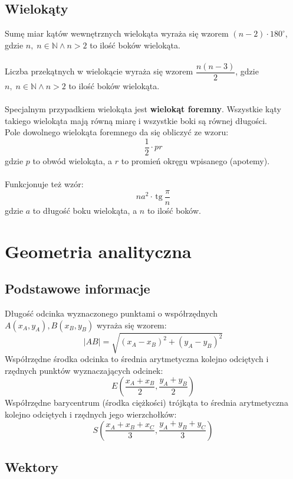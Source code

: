 \documentclass[14pt,a4paper]{extarticle}
\newcommand{\Verts}[1]{\left\lVert#1\right\rVert}
\newcommand{\tg}{\,\text{tg}\:}
\begin{document}
\subsection{Wielokąty}
\noindent Sumę miar kątów wewnętrznych wielokąta wyraża się wzorem $(n - 2)\cdot 180^{\circ}$, gdzie $n,\; n\in \mathbb{N} \land n > 2$
to ilość boków wielokąta.\\\\
\noindent Liczba przekątnych w wielokącie wyraża się wzorem $\dfrac{n(n-3)}{2}$, gdzie $n,\; n\in \mathbb{N} \land n > 2$
to ilość boków wielokąta.\\\\
Specjalnym przypadkiem wielokąta jest \textbf{wielokąt foremny}. Wszystkie kąty takiego wielokąta mają
równą miarę i wszystkie boki są równej długości.\\
Pole dowolnego wielokąta foremnego da się obliczyć ze wzoru:
$$\dfrac{1}{2}\cdot pr$$
gdzie $p$ to obwód wielokąta, a $r$ to promień okręgu wpisanego (apotemy).\\\\ Funkcjonuje też wzór:
$$na^{2}\cdot\tg\frac{\pi}{n}$$
gdzie $a$ to długość boku wielokąta, a $n$ to ilość boków.

\newpage
\section{Geometria analityczna}

\subsection{Podstawowe informacje}
\MoveBelowBox
{}
\hfill\break
\noindent Długość odcinka wyznaczonego punktami o współrzędnych $A(x_{A}, y_{A}), B(x_{B}, y_{B})$
wyraża się wzorem:
$$\vert AB\vert = \sqrt{(x_{A} - x_{B})^{2}+(y_{A}-y_{B})^{2}}$$
\MoveBelowBox
\noindent Współrzędne środka odcinka to średnia arytmetyczna kolejno odciętych i rzędnych punktów wyznaczających odcinek:
$$E\left(\dfrac{x_{A}+x_{B}}{2}, \dfrac{y_{A}+y_{B}}{2}\right)$$
\noindent Współrzędne barycentrum (środka ciężkości) trójkąta to średnia arytmetyczna kolejno odciętych i
rzędnych jego wierzchołków:
$$S\left(\dfrac{x_{A}+x_{B}+x_{C}}{3}, \dfrac{y_{A}+y_{B}+y_{C}}{3}\right)$$

\subsection{Wektory}
\end{document}
